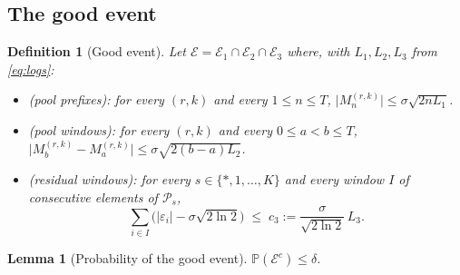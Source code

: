 \documentclass[11pt]{article}
\newtheorem{definition}{Definition}
\newtheorem{lemma}{Lemma}
\newcommand{\Ecal}{\mathcal E}
\newcommand{\Pcal}{\mathcal P}
\newcommand{\Pbb}{\mathbb P}
\begin{document}
\subsection{The good event}

\begin{definition}[Good event]
\label{def:good_event}
Let $\Ecal=\Ecal_1\cap\Ecal_2\cap\Ecal_3$ where, with $L_1,L_2,L_3$ from \eqref{eq:logs}:
\begin{itemize}[leftmargin=1.4em]
\item[$\Ecal_1$] (\emph{pool prefixes}): for every $(r,k)$ and every $1\le n\le T$,
$\bigl|M^{(r,k)}_n\bigr|\le\sigma\sqrt{2nL_1}$.
\item[$\Ecal_2$] (\emph{pool windows}): for every $(r,k)$ and every $0\le a<b\le T$,
$\bigl|M^{(r,k)}_b-M^{(r,k)}_a\bigr|\le\sigma\sqrt{2(b-a)L_2}$.
\item[$\Ecal_3$] (\emph{residual windows}): for every $s\in\{\ast,1,\ldots,K\}$ and every window $I$ of consecutive elements of $\Pcal_s$,
\begin{equation}
    \sum_{i\in I}\bigl(|\varepsilon_i|-\sigma\sqrt{2\ln2}\bigr)\;\le\;c_3
    :=\frac{\sigma}{\sqrt{2\ln2}}\,L_3 .
    \label{eq:E3}
\end{equation}
\end{itemize}
\end{definition}

\begin{lemma}[Probability of the good event]
\label{lem:good_event}
$\Pbb(\Ecal^c)\le\delta$.
\end{lemma}
\end{document}
